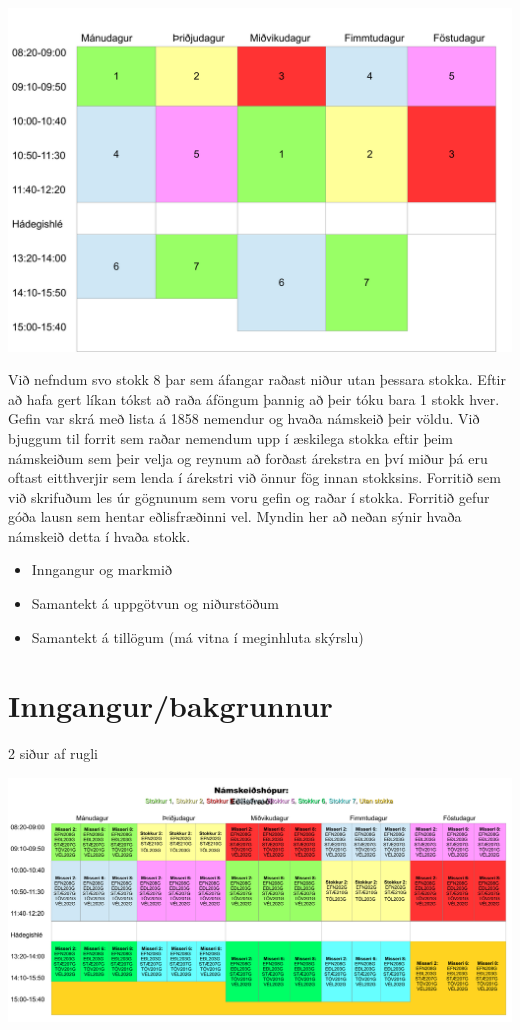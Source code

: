 \documentclass[a4paper,12pt]{article}
\begin{document}
\begin{center}
\includegraphics[scale=0.3]{stundatafla}
\end{center}
Við nefndum svo stokk 8 þar sem áfangar raðast niður utan þessara stokka. Eftir að hafa gert líkan tókst að raða áföngum þannig að þeir tóku bara 1 stokk hver. Gefin var skrá með lista á 1858 nemendur og hvaða námskeið þeir völdu. Við bjuggum til forrit sem raðar nemendum upp í æskilega stokka eftir þeim námskeiðum sem þeir velja og reynum að forðast árekstra en því miður þá eru oftast eitthverjir sem lenda í árekstri við önnur fög innan stokksins. Forritið sem við skrifuðum les úr gögnunum sem voru gefin og raðar í stokka. Forritið gefur góða lausn sem hentar eðlisfræðinni vel. Myndin her að neðan sýnir hvaða námskeið detta í hvaða stokk.




\begin{itemize}
\item Inngangur og markmið
\item Samantekt á uppgötvun og niðurstöðum
\item Samantekt á tillögum (má vitna í meginhluta skýrslu)
\end{itemize}


\section{Inngangur/bakgrunnur}


2 siður af rugli



\includegraphics[scale=0.3]{stundatoflur}
\end{document}
